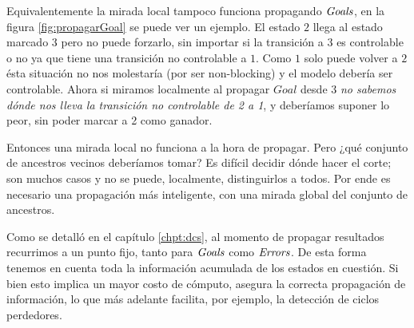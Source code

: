 Equivalentemente la mirada local tampoco funciona propagando $\mathit{Goals}$, en la figura \ref{fig:propagarGoal} se puede ver un ejemplo. El estado $2$ llega al estado marcado $3$ pero no puede forzarlo, sin importar si la transición a $3$ es controlable o no ya que tiene una transición no controlable a $1$. Como $1$ solo puede volver a $2$ ésta situación no nos molestaría (por ser non-blocking) y el modelo debería ser controlable. Ahora si miramos localmente al propagar $Goal$ desde $3$ \textit{no sabemos dónde nos lleva la transición no controlable de 2 a 1}, y deberíamos suponer lo peor, sin poder marcar a 2 como ganador.

Entonces una mirada local no funciona a la hora de propagar. Pero ¿qué conjunto de ancestros vecinos deberíamos tomar? Es difícil decidir dónde hacer el corte; son muchos casos y no se puede, localmente, distinguirlos a todos. Por ende es necesario una propagación más inteligente, con una mirada global del conjunto de ancestros.

Como se detalló en el capítulo \ref{chpt:dcs}, al momento de propagar resultados recurrimos a un punto fijo, tanto para $\mathit{Goals}$ como $\mathit{Errors}$. De esta forma tenemos en cuenta toda la información acumulada de los estados en cuestión. Si bien esto implica un mayor costo de cómputo, asegura la correcta propagación de información, lo que más adelante facilita, por ejemplo, la detección de ciclos perdedores.\\

